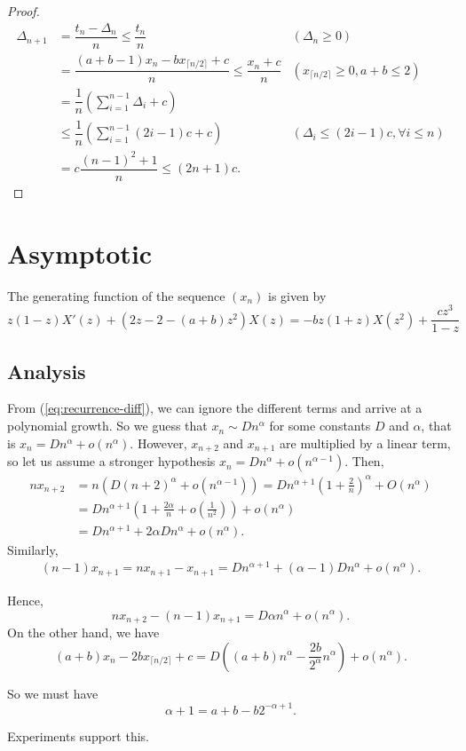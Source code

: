 \begin{proof}
  \begin{align*}
    \Delta_{n+1}
     & =  \dfrac{t_n-\Delta_n}{n} \le \dfrac{t_n}  {n}                                       & (\Delta_n\ge0)                         \\
     & = \dfrac{(a+b-1)x_n - b x_{\lceil n/2\rceil} + c}{n}             \le \dfrac{x_n+c}{n} & (x_{\lceil n/2\rceil}\ge0, a+b\le 2)   \\
     & = \dfrac{1}{n}\left(\sum_{i=1}^{n-1} \Delta_i + c\right)                                                                       \\
     & \le \dfrac{1}{n}\left(\sum_{i=1}^{n-1} (2i-1)c + c\right)                             & (\Delta_i \le (2i-1)c, \forall i\le n) \\
     & = c\dfrac{(n-1)^2 + 1}{n} \le (2n+1)c.
  \end{align*}
\end{proof}

\section{Asymptotic}

\begin{proposition}
  The generating function of the sequence $(x_n)$ is given by
  \begin{equation}
    z(1-z) X'(z) + (2z - 2 - (a+b)z^2) X(z) = -b z(1+z) X(z^2) + \frac{cz^3}{1-z}
  \end{equation}
\end{proposition}

\subsection{Analysis}

From (\ref{eq:recurrence-diff}), we can ignore the different terms and arrive at a polynomial growth. So we guess that $x_n \sim D n^{\alpha}$ for some constants $D$ and $\alpha$, that is $x_n = D n^{\alpha} + o(n^{\alpha})$. However, $x_{n+2}$ and $x_{n+1}$ are multiplied by a linear term, so let us assume a stronger hypothesis $x_n = D n^{\alpha} + o(n^{\alpha-1})$. Then,
\begin{align*}
  nx_{n+2}
   & = n(D(n+2)^{\alpha} + o(n^{\alpha-1})) = D n^{\alpha+1}\left(1 + \frac{2}{n}\right)^\alpha + O(n^{\alpha}) \\
   & = Dn^{\alpha+1}\left(1+\frac{2\alpha}{n} + o\left(\frac{1}{n^2}\right)\right) + o(n^{\alpha})              \\
   & = D n^{\alpha+1} + 2\alpha D n^{\alpha} + o(n^{\alpha}).
\end{align*}
Similarly,
\begin{align*}
  (n-1)x_{n+1} = nx_{n+1} - x_{n+1} = D n^{\alpha+1} + (\alpha-1) D n^{\alpha} + o(n^{\alpha}).
\end{align*}

Hence,
$$nx_{n+2} - (n-1)x_{n+1} = D \alpha n^{\alpha} + o(n^{\alpha}).$$
On the other hand, we have
$$(a+b)x_n - 2bx_{\lceil n/2\rceil} + c = D\left((a+b) n^{\alpha} - \dfrac{2b}{2^\alpha} n^{\alpha}\right) + o(n^{\alpha}).$$

So we must have
$$\alpha+1 = a+ b - b2^{-\alpha+1}.$$

Experiments support this.